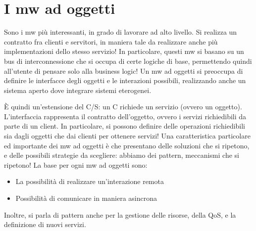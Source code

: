 \section{I mw ad oggetti}
Sono i mw più interessanti, in grado di lavorare ad alto livello. Si realizza un contratto fra clienti e servitori,
in maniera tale da realizzare anche più implementazioni dello stesso servizio! In particolare, questi mw si basano su
un bus di interconnessione che si occupa di certe logiche di base, permettendo quindi all'utente di pensare solo alla
business logic! Un mw ad oggetti si preoccupa di definire le interfacce degli oggetti e le interazioni possibili,
realizzando anche un sistema aperto dove integrare sistemi eterogenei.

È quindi un'estensione del C/S: un C richiede un servizio (ovvero un oggetto). L'interfaccia rappresenta il contratto
dell'oggetto, ovvero i servizi richiedibili da parte di un client. In particolare, si possono definire delle operazioni
richiedibili sia dagli oggetti che dai clienti per ottenere servizi!
Una caratteristica particolare ed importante dei mw ad oggetti è che presentano delle soluzioni che si ripetono, e
delle possibili strategie da scegliere: abbiamo dei pattern, meccanismi che si ripetono!
La base per ogni mw ad oggetti sono:
\begin{itemize}
 \item La possibilità di realizzare un'interazione remota
 \item Possibilità di comunicare in maniera asincrona
\end{itemize}
Inoltre, si parla di pattern anche per la gestione delle risorse, della QoS, e la definizione di nuovi servizi.
